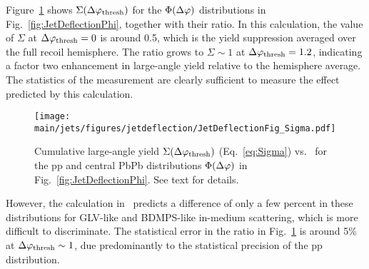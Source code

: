 \noindent
Figure~\ref{fig:JetDeflectionSigma} shows $\Sigma(\Delta\varphi_{\mathrm{thresh}})$ for the $\Phi(\Delta\varphi)$ distributions in Fig.~\ref{fig:JetDeflectionPhi}, together with their ratio. In this calculation, the value of $\Sigma$ at $\Delta\varphi_{\mathrm{thresh}}=0$ is around 0.5, which is the yield suppression averaged over the full recoil hemisphere. The ratio grows to $\Sigma\sim1$ at $\Delta\varphi_{\mathrm{thresh}}=1.2$, indicating a factor two enhancement in large-angle yield relative to the hemisphere average. The statistics of the measurement are clearly sufficient to measure the effect predicted by this calculation.
\begin{figure}[tbh!]
\centering
\texttt{[image: \\main/jets/figures/jetdeflection/JetDeflectionFig\_Sigma.pdf]}
\caption{Cumulative large-angle yield $\Sigma(\Delta\varphi_{\mathrm{thresh}})$ (Eq.~\ref{eq:Sigma}) vs. \dphithresh\ for the pp and central PbPb distributions $\Phi(\Delta\varphi)$ in Fig.~\ref{fig:JetDeflectionPhi}. See text for details. 
}
\label{fig:JetDeflectionSigma}
\end{figure}
However, the calculation in~\cite{Gyulassy:2018qhr} predicts a difference of only a few percent in these distributions for GLV-like and BDMPS-like in-medium scattering, which is more difficult to discriminate. The statistical error in the ratio in Fig.~\ref{fig:JetDeflectionSigma} is around 5\% at $\Delta\varphi_{\mathrm{thresh}}\sim1$, due predominantly to the statistical precision of the pp distribution. %

